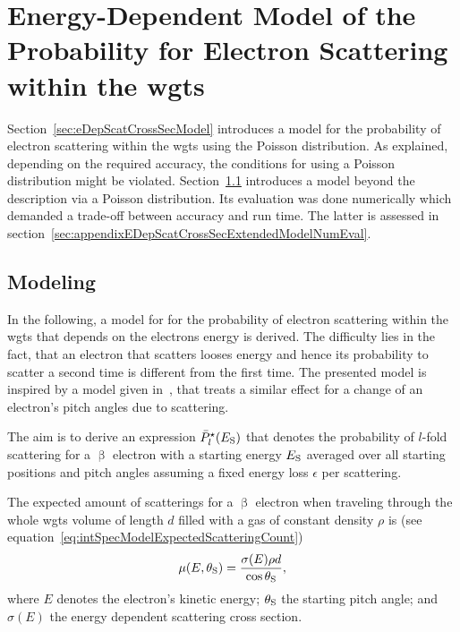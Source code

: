 \section{Energy-Dependent Model of the Probability for Electron Scattering within the \gls{wgts}}
\label{sec:appendixEDepScatCrossSecExtendedModel}
Section~\ref{sec:eDepScatCrossSecModel} introduces a model for the probability of electron scattering within the \gls{wgts} using the Poisson distribution. As explained, depending on the required accuracy, the conditions for using a Poisson distribution might be violated. Section~\ref{sec:appendixEDepScatCrossSecExtendedModelFormalism} introduces a model beyond the description via a Poisson distribution. Its evaluation was done numerically which demanded a trade-off between accuracy and run time. The latter is assessed in section~\ref{sec:appendixEDepScatCrossSecExtendedModelNumEval}.
\subsection{Modeling}
\label{sec:appendixEDepScatCrossSecExtendedModelFormalism}
In the following, a model for for the probability of electron scattering within the \gls{wgts} that depends on the electrons energy is derived. The difficulty lies in the fact, that an electron that scatters looses energy and hence its probability to scatter a second time is different from the first time. The presented model is inspired by a model given in~\cite{Groh2015}, that treats a similar effect for a change of an electron's pitch angles due to scattering. 

The aim is to derive an expression $\bar{P}^{\star}_l(E_\mathrm{S})$ that denotes the probability of $l$-fold scattering for a $\upbeta$ electron with a starting energy $E_\mathrm{S}$ averaged over all starting positions and pitch angles assuming a fixed energy loss $\epsilon$ per scattering.

The expected amount of scatterings for a $\upbeta$ electron when traveling  through the whole \gls{wgts} volume of length $d$ filled with a gas of constant density $\rho$ is (see equation~\ref{eq:intSpecModelExpectedScatteringCount})
\begin{equation}
    \mu(E,\theta_\mathrm{S}) =
    \frac{\sigma(E)\rho d}{\cos\theta_\mathrm{S}},
\end{equation}
where $E$ denotes the electron's kinetic energy; $\theta_\mathrm{S}$ the starting pitch angle; and $\sigma(E)$ the energy dependent scattering cross section.

